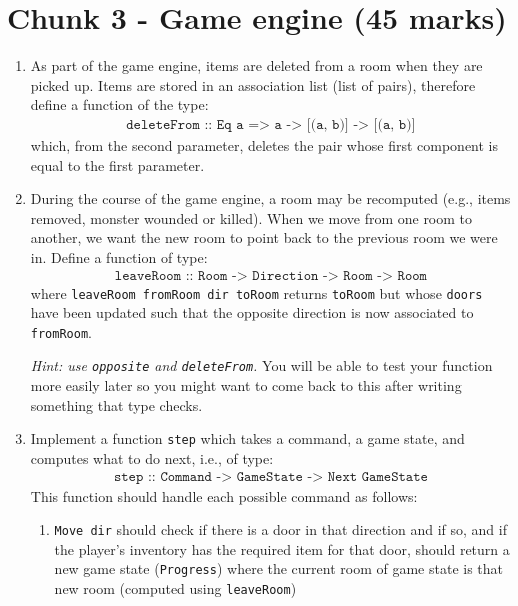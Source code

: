 \documentclass{article}
\newcommand{\topMarks}[1]{\marginnote{(#1 marks)}}
\begin{document}
\section*{Chunk 3 - Game engine (45 marks)}

\begin{enumerate}[leftmargin=1.4em]

\item \topMarks{5} As part of the game engine, items are deleted from
  a room when they are picked up. Items are stored in an association
  list (list of pairs), therefore define a function of the type:
%
\begin{align*}
\texttt{deleteFrom :: Eq a => a -> [(a, b)] -> [(a, b)]}
\end{align*}
%
which, from the second parameter, deletes the pair whose first
component is equal to the first parameter.

\item \topMarks{4} During the course of the game engine, a room may
be recomputed (e.g., items removed, monster wounded
or killed). When we move from one room to another, we want
the new room to point back to the previous room we were in. Define
a function of type:
%
\begin{align*}
\texttt{leaveRoom :: Room -> Direction -> Room -> Room}
\end{align*}
%
where \texttt{leaveRoom fromRoom dir toRoom} returns \texttt{toRoom}
but whose \texttt{doors} have been updated such that the opposite
direction is now associated to \texttt{fromRoom}.

\emph{Hint: use \texttt{opposite} and
\texttt{deleteFrom}.} You will be able to test your function
more easily later so you might want to come back to this after
writing something that type checks.


\item \topMarks{15} Implement a function \texttt{step} which takes a command,
a game state, and computes what to do next, i.e., of type:
%
\begin{align*}
\texttt{step :: Command -> GameState -> Next GameState}
\end{align*}
%
This function should handle each possible
command as follows:
%
\begin{enumerate}
\item \texttt{Move dir} should check
if there is a door in that direction and if so, and if the player's
inventory has the required item for that door, should return
a new game state (\texttt{Progress}) where the current room of game
state is that new room (computed using \texttt{leaveRoom})


\end{enumerate}
\end{enumerate}
\end{document}
